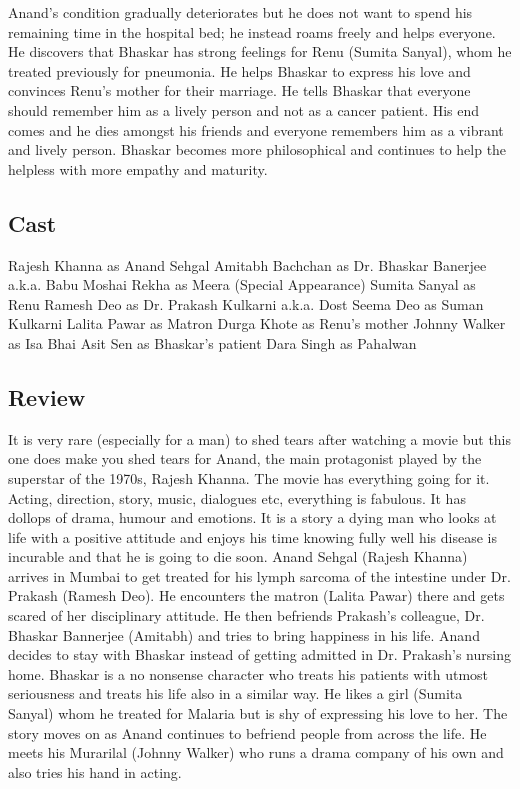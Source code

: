 \documentclass[11pt]{article}
\begin{document}
Anand's condition gradually deteriorates but he does not want to spend his remaining time in the 
hospital bed; he instead roams freely and helps everyone. He discovers that Bhaskar has strong 
feelings for Renu (Sumita Sanyal), whom he treated previously for pneumonia. He helps Bhaskar to
express his love and convinces Renu's mother for their marriage. He tells Bhaskar that everyone
should remember him as a lively person and not as a cancer patient. His end comes and he dies 
amongst his friends and everyone remembers him as a vibrant and lively person. Bhaskar becomes
more philosophical and continues to help the helpless with more empathy and maturity.

\subsection*{Cast}
Rajesh Khanna as Anand Sehgal
Amitabh Bachchan as Dr. Bhaskar Banerjee a.k.a. Babu Moshai
Rekha as Meera (Special Appearance)
Sumita Sanyal as Renu
Ramesh Deo as Dr. Prakash Kulkarni a.k.a. Dost
Seema Deo as Suman Kulkarni
Lalita Pawar as Matron
Durga Khote as Renu's mother
Johnny Walker as Isa Bhai
Asit Sen as Bhaskar's patient
Dara Singh as Pahalwan

\subsection*{Review}
It is very rare (especially for a man) to shed tears after watching a movie but this one does make you shed tears for Anand, the main protagonist played by the superstar of the 1970s, Rajesh Khanna. The movie has everything going for it. Acting, direction, story, music, dialogues etc, everything is fabulous. It has dollops of drama, humour and emotions. It is a story a dying man who looks at life with a positive attitude and enjoys his time knowing fully well his disease is incurable and that he is going to die soon.
Anand Sehgal (Rajesh Khanna) arrives in Mumbai to get treated for his lymph sarcoma of the intestine under Dr. Prakash (Ramesh Deo). He encounters the matron (Lalita Pawar) there and gets scared of her disciplinary attitude. He then befriends Prakash’s colleague, Dr. Bhaskar Bannerjee (Amitabh) and tries to bring happiness in his life. Anand decides to stay with Bhaskar instead of getting admitted in Dr. Prakash’s nursing home. Bhaskar is a no nonsense character who treats his patients with utmost seriousness and treats his life also in a similar way. He likes a girl (Sumita Sanyal) whom he treated for Malaria but is shy of expressing his love to her. The story moves on as Anand continues to befriend people from across the life. He meets his Murarilal (Johnny Walker) who runs a drama company of his own and also tries his hand in acting.
\end{document}
